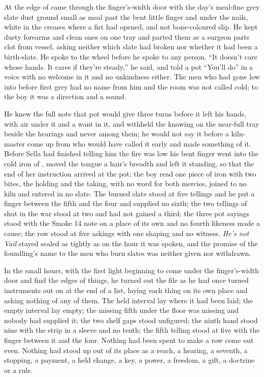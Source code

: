At the edge of   came through the finger's-width door with the day's meal-fine grey slate dust ground small as meal past the bent little finger and under the nails, white in the creases where a fist had opened, and not bone-coloured slip. He kept dusty forearms and clean ones on one tray and parted them as a surgeon parts clot from vessel, asking neither which slate had broken nor whether it had been a birth-slate. He spoke to the wheel before he spoke to any person. “It doesn't care whose hands. It cares if they're steady,” he said, and told a pot “You'll do” in a voice with no welcome in it and no unkindness either. The men who had gone low into  before first grey had no name from him and the room was not called cold; to the boy it was a direction and a sound.

He knew the full note that pot would give three turns before it left his hands, with air under it and a want in it, and withheld the knowing on the near-full tray beside the hearings and never among them; he would not say it before a kiln-master come up from  who would have called it early and made something of it. Before Sella had finished telling him the fire was low his bent finger went into the cold iron of , moved the tongue a hair's breadth and left it standing, so that the end of her instruction arrived at the pot; the boy read one piece of iron with two bites, the holding and the taking, with no  word for both mercies, joined to no kiln and entered in no slate. The burned slate stood at five tellings and he put a finger between the fifth and the four and supplied no sixth; the two tellings of  shut in the war stood at two and had not gained a third; the three pot sayings stood with the Smoke 14 note on a place of its own and no fourth likeness made a cause; the row stood at five askings with one shaping and no witness. \emph{He's not Vail} stayed sealed as tightly as on the hour it was spoken, and the promise of the foundling's name to the men who burn slates was neither given nor withdrawn.

\scenebreak

In the small hours, with the first light beginning to come under the finger's-width door and find the edges of things, he turned out the file as he had once turned instruments out on  at the end of a list, laying each thing on its own place and asking nothing of any of them. The held interval lay where it had been laid; the empty interval lay empty; the missing fifth under the floor was missing and nobody had supplied it; the two shelf gaps stood unfigured; the ninth hand stood nine with the strip in a sleeve and no tenth; the fifth telling stood at five with the finger between it and the four. Nothing had been spent to make a row come out even. Nothing had stood up out of its place as a reach, a hearing, a seventh, a stopping, a payment, a held change, a key, a power, a freedom, a gift, a doctrine or a rule.

